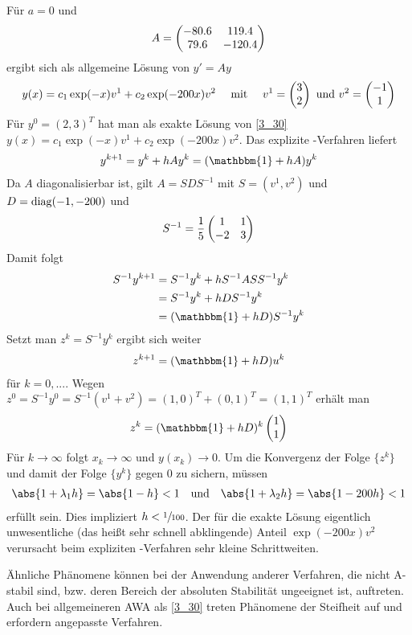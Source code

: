 \begin{example}
	Für $a=0$ und
	\begin{align}
		A = \begin{pmatrix}
			-80.6 & 119.4 \\ 79.6 & -120.4
		\end{pmatrix} \notag
	\end{align}
	ergibt sich als allgemeine Lösung von $y'=Ay$
	\begin{align}
		y(x) = c_1\exp(-x)v^1 + c_2\exp(-200x)v^2 \quad\mit\quad v^1 = \begin{pmatrix}
			3 \\ 2
		\end{pmatrix} \text{ und } v^2 = \begin{pmatrix}
			-1 \\ 1
		\end{pmatrix} \notag
	\end{align}
	Für $y^0=(2,3)^T$ hat man als exakte Lösung von \cref{3_30} $y(x) = c_1\exp(-x)v^1 + c_2\exp(-200x)v^2$. Das explizite -Verfahren liefert
	\begin{align}
		y^{k+1} = y^k + hAy^k = (\mathbbm{1} + hA)y^k \notag
	\end{align}
	Da $A$ diagonalisierbar ist, gilt $A=SDS^{-1}$ mit $S=(v^1,v^2)$ und $D=\diag(-1,-200)$ und
	\begin{align}
		S^{-1} = \frac{1}{5}\begin{pmatrix}
			1 & 1 \\ -2 & 3
		\end{pmatrix}\notag
	\end{align}
	Damit folgt
	\begin{align}
		S^{-1}y^{k+1} &= S^{-1}y^k + hS^{-1}ASS^{-1}y^k \notag \\
		&= S^{-1}y^k + hDS^{-1}y^k \notag \\
		&= (\mathbbm{1} + hD)S^{-1}y^k \notag
	\end{align}
	Setzt man $z^k = S^{-1}y^k$ ergibt sich weiter
	\begin{align}
		z^{k+1} = (\mathbbm{1} + hD)u^k \notag
	\end{align}
	für $k=0,...$. Wegen $z^0=S^{-1}y^0 = S^{-1}(v^1+v^2) = (1,0)^T + (0,1)^T = (1,1)^T$ erhält man
	\begin{align}
		z^k = (\mathbbm{1} + hD)^k\begin{pmatrix}
			1 \\ 1
		\end{pmatrix} \notag
	\end{align}
	Für $k\to\infty$ folgt $x_k\to\infty$ und $y(x_k)\to 0$. Um die Konvergenz der Folge $\{z^k\}$ und damit der Folge $\{y^k\}$ gegen 0 zu sichern, müssen
	\begin{align}
		\abs{1+\lambda_1 h} = \abs{1-h} < 1\quad\text{und}\quad \abs{1+\lambda_2 h} = \abs{1-200h} < 1 \notag
	\end{align}
	erfüllt sein. Dies impliziert $h < \sfrac{1}{100}$. Der für die exakte Lösung eigentlich unwesentliche (das heißt sehr schnell abklingende) Anteil $\exp(-200x)v^2$ verursacht beim expliziten -Verfahren sehr kleine Schrittweiten.
\end{example}

Ähnliche Phänomene können bei der Anwendung anderer Verfahren, die nicht A-stabil sind, bzw. deren Bereich der absoluten Stabilität ungeeignet ist, auftreten. Auch bei allgemeineren AWA als \cref{3_30} treten Phänomene der Steifheit auf und erfordern angepasste Verfahren.